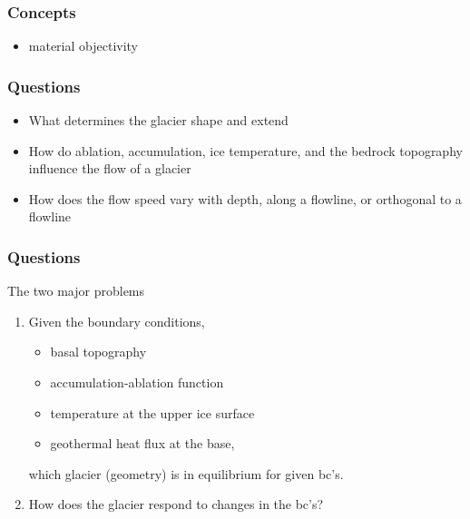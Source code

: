 \documentclass[hide notes,intlimits]{beamer}
\begin{document}
\begin{frame}
  \frametitle{Concepts}
 \begin{itemize}
    \item material objectivity
  \end{itemize}
\end{frame}

\begin{frame}
  \frametitle{Questions}
 \begin{itemize}
    \item What determines the glacier shape and extend
    \item How do ablation, accumulation, ice temperature, and the bedrock topography influence the flow of a glacier
    \item How does the flow speed vary with depth, along a flowline, or orthogonal to a flowline
  \end{itemize}
\end{frame}

\begin{frame}
  \frametitle{Questions}
 \begin{block}{The two major problems}
   \begin{enumerate}
   \item Given the boundary conditions,
     \begin{itemize}
     \item basal topography
     \item accumulation-ablation function
     \item temperature at the upper ice surface
     \item geothermal heat flux at the base,
   \end{itemize}
   which glacier (geometry) is in equilibrium for given bc's.
  \item How does the glacier respond to changes in the bc's?
\end{enumerate}
  \end{block}
\end{frame}
\end{document}
